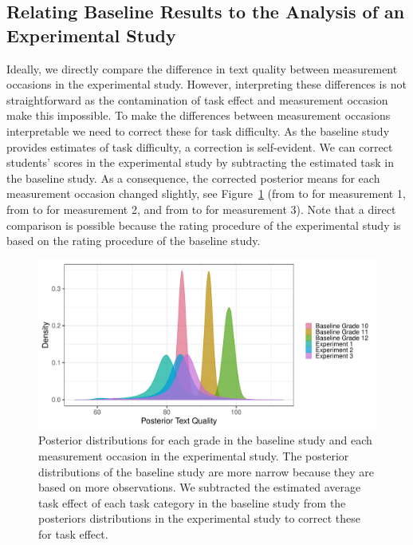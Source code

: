 \documentclass[a4paper]{article}
\newcommand{\getVal}[3]{%
	\pgfplotstablegetelem{#1}{#2}\of{#3}%
	\pgfmathprintnumber{\pgfplotsretval}%
}
\begin{document}
\subsection*{Relating Baseline Results to the Analysis of an Experimental Study}
\tbPostMeansProdCC

Ideally, we directly compare the difference in text quality between measurement occasions in the experimental study. However, interpreting these differences is not straightforward as the contamination of task effect and measurement occasion make this impossible. To make the differences between measurement occasions interpretable we need to correct these for task difficulty. As the baseline study provides estimates of task difficulty, a correction is self-evident.  We can correct students' scores in the experimental study by subtracting the estimated task in the baseline study. As a consequence, the corrected posterior means for each measurement occasion changed slightly, see Figure~\ref{fig:comparePostTextQual} (from \getVal{0}{Mean}{\tbPostMeansProdCC} to \getVal{3}{Mean}{\tbPostMeansProdCC} for measurement 1, from \getVal{1}{Mean}{\tbPostMeansProdCC} to \getVal{4}{Mean}{\tbPostMeansProdCC} for measurement 2, and from \getVal{2}{Mean}{\tbPostMeansProdCC} to \getVal{5}{Mean}{\tbPostMeansProdCC} for measurement 3). Note that a direct comparison is possible because the rating procedure of the experimental study is based on the rating procedure of the baseline study.
\begin{figure}[!ht]
	\includegraphics[width=\textwidth]{comparePosteriorTextQuality.pdf}
	\caption{Posterior distributions for each grade in the baseline study and each measurement occasion in the experimental study. The posterior distributions of the baseline study are more narrow because they are based on more observations. We subtracted the estimated average task effect of each task category in the baseline study from the posteriors distributions in the experimental study to correct these for task effect.}
	\label{fig:comparePostTextQual}
\end{figure}
\end{document}
